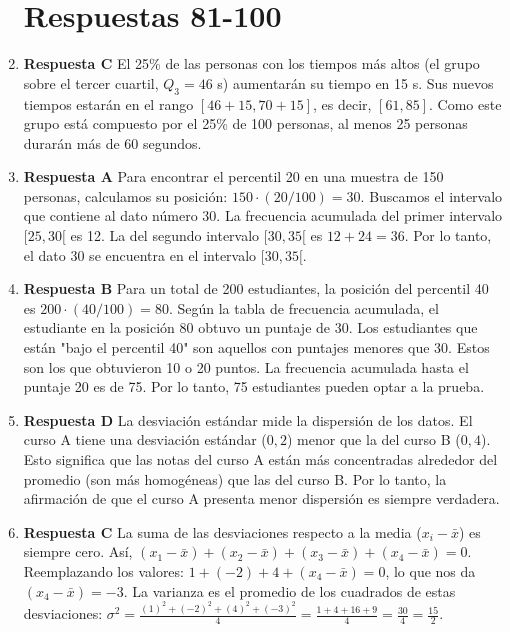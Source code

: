 \documentclass[11pt]{article}
\begin{document}
\begin{enumerate}
\section{Respuestas 81-100}

    \item \textbf{Respuesta C} El 25\% de las personas con los tiempos más altos (el grupo sobre el tercer cuartil, $Q_3=46$ s) aumentarán su tiempo en 15 s. Sus nuevos tiempos estarán en el rango $[46+15, 70+15]$, es decir, $[61, 85]$. Como este grupo está compuesto por el 25\% de 100 personas, al menos 25 personas durarán más de 60 segundos. %
    
    \item \textbf{Respuesta A} Para encontrar el percentil 20 en una muestra de 150 personas, calculamos su posición: $150 \cdot (20/100) = 30$. Buscamos el intervalo que contiene al dato número 30. La frecuencia acumulada del primer intervalo $[25, 30[$ es 12. La del segundo intervalo $[30, 35[$ es $12 + 24 = 36$. Por lo tanto, el dato 30 se encuentra en el intervalo $[30, 35[$. %
    
    \item \textbf{Respuesta B} Para un total de 200 estudiantes, la posición del percentil 40 es $200 \cdot (40/100) = 80$. Según la tabla de frecuencia acumulada, el estudiante en la posición 80 obtuvo un puntaje de 30. Los estudiantes que están "bajo el percentil 40" son aquellos con puntajes menores que 30. Estos son los que obtuvieron 10 o 20 puntos. La frecuencia acumulada hasta el puntaje 20 es de 75. Por lo tanto, 75 estudiantes pueden optar a la prueba. %

    \item \textbf{Respuesta D} La desviación estándar mide la dispersión de los datos. El curso A tiene una desviación estándar ($0,2$) menor que la del curso B ($0,4$). Esto significa que las notas del curso A están más concentradas alrededor del promedio (son más homogéneas) que las del curso B. Por lo tanto, la afirmación de que el curso A presenta menor dispersión es siempre verdadera. %

    \item \textbf{Respuesta C} La suma de las desviaciones respecto a la media ($x_i - \bar{x}$) es siempre cero. Así, $(x_1-\bar{x})+(x_2-\bar{x})+(x_3-\bar{x})+(x_4-\bar{x}) = 0$. Reemplazando los valores: $1 + (-2) + 4 + (x_4 - \bar{x}) = 0$, lo que nos da $(x_4 - \bar{x}) = -3$. La varianza es el promedio de los cuadrados de estas desviaciones: $\sigma^2 = \frac{(1)^2+(-2)^2+(4)^2+(-3)^2}{4} = \frac{1+4+16+9}{4} = \frac{30}{4} = \frac{15}{2}$. %
    

\end{enumerate}
\end{document}
